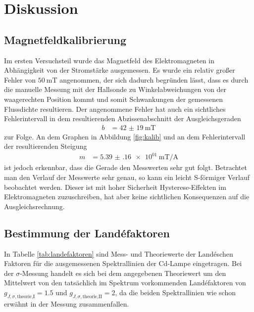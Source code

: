 \section{Diskussion}
\label{sec:Diskussion}

\subsection{Magnetfeldkalibrierung}

Im ersten Versuchsteil wurde das Magnetfeld des Elektromagneten
in Abhängigkeit von der Stromstärke ausgemessen. Es wurde ein relativ großer Fehler von
$\SI{50}{\milli\tesla}$ angenommen, der sich dadurch begründen lässt, dass es
durch die manuelle Messung mit der Hallsonde zu Winkelabweichungen von der waagerechten Position kommt
und somit Schwankungen der gemessenen Flussdichte resultieren. Der angenommene Fehler
hat auch ein sichtliches Fehlerintervall in dem resultierenden Abzissenabschnitt der Ausgleichsgeraden
\begin{align}
  b &= \SI{42(19)}{\milli\tesla}
\end{align}
zur Folge. An dem Graphen in Abbildung \ref{fig:kalib} und an dem Fehlerintervall der resultierenden Steigung
\begin{align}
  m &= \SI{5.39(16)e01}{\milli\tesla\per\ampere}
\end{align}
ist jedoch erkennbar, dass die Gerade den Messwerten sehr gut folgt. Betrachtet man den Verlauf der
Messwerte sehr genau, so kann ein leicht S-förmiger Verlauf beobachtet werden. Dieser ist mit
hoher Sicherheit Hysterese-Effekten im Elektromagneten zuzuschreiben, hat aber keine
sichtlichen Konsequenzen auf die Ausgleichsrechnung.

\subsection{Bestimmung der Landéfaktoren}

In Tabelle \ref{tab:landefaktoren} sind Mess- und Theoriewerte der Landéschen Faktoren für
die ausgemessenen Spektrallinien der Cd-Lampe eingetragen.
Bei der $\sigma$-Messung handelt es sich bei dem angegebenen Theoriewert
um den Mittelwert von den tatsächlich im Spektrum vorkommenden Landéfaktoren von
$g_{J,\sigma,\text{theorie,I}} = 1.5$ und $g_{J,\sigma,\text{theorie,II}} = 2$,
da die beiden Spektrallinien wie schon erwähnt in der Messung zusammenfallen.


